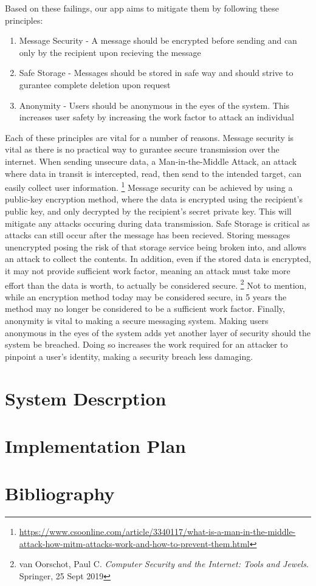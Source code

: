 \documentclass[titlepage]{article}
\begin{document}
    Based on these failings, our app aims to mitigate them by following these principles:
    \begin{enumerate}
        \item Message Security - A message should be encrypted before sending and can only by the recipient upon recieving the message
        \item Safe Storage - Messages should be stored in safe way and should strive to gurantee complete deletion upon request
        \item Anonymity - Users should be anonymous in the eyes of the system. This increases user safety by increasing the work factor to attack an individual
    \end{enumerate}
    Each of these principles are vital for a number of reasons.
    Message security is vital as there is no practical way to gurantee secure transmission over the internet.
    When sending unsecure data, a Man-in-the-Middle Attack, an attack where data in transit is intercepted, read, then send to the intended target, can easily collect user information.
    \footnote{\url{https://www.csoonline.com/article/3340117/what-is-a-man-in-the-middle-attack-how-mitm-attacks-work-and-how-to-prevent-them.html}}
    Message security can be achieved by using a public-key encryption method, where the data is encrypted using the recipient's public key, and only decrypted by the recipient's secret private key.
    This will mitigate any attacks occuring during data transmission.
    Safe Storage is critical as attacks can still occur after the message has been recieved.
    Storing messages unencrypted posing the risk of that storage service being broken into, and allows an attack to collect the contents.
    In addition, even if the stored data is encrypted, it may not provide sufficient work factor, meaning an attack must take more effort than the data is worth, to actually be considered secure.
    \footnote{van Oorschot, Paul C. \textit{Computer Security and the Internet: Tools and Jewels}. Springer, 25 Sept 2019}
    Not to mention, while an encryption method today may be considered secure, in 5 years the method may no longer be considered to be a sufficient work factor.
    Finally, anonymity is vital to making a secure messaging system.
    Making users anonymous in the eyes of the system adds yet another layer of security should the system be breached.
    Doing so increases the work required for an attacker to pinpoint a user's identity, making a security breach less damaging.

    \section{System Descrption}

    \section{Implementation Plan}

    \newpage
    \section*{Bibliography}
\end{document}
